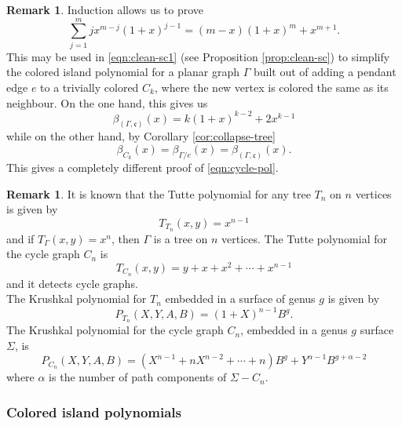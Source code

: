 \documentclass[10pt, reqno]{amsart}
\newcommand{\hf}{\hspace*{0.5cm}}
\theoremstyle{plain}
\theoremstyle{remark}
\theoremstyle{definition}
\newtheorem{rem}[theorem]{Remark}
\numberwithin{equation}{section}
\begin{document}
\begin{rem}
Induction allows us to prove
$$\sum_{j=1}^m jx^{m-j}(1+x)^{j-1}=(m-x)(1+x)^m+x^{m+1}.$$
This may be used in \eqref{eqn:clean-sc1} (see Proposition \ref{prop:clean-sc}) to simplify the colored island polynomial for a planar graph $\Gamma$ built out of adding a pendant edge $e$ to a trivially colored $C_k$, where the new vertex is colored the same as its neighbour. On the one hand, this gives us
$$\beta_{(\Gamma,\mathfrak{c})}(x)=k(1+x)^{k-2}+2x^{k-1}$$
while on the other hand, by Corollary \ref{cor:collapse-tree}   
$$\beta_{C_k}(x)=\beta_{\Gamma/e}(x)=\beta_{(\Gamma,\mathfrak{c})}(x).$$
This gives a completely different proof of \eqref{eqn:cycle-pol}.
\end{rem}
\begin{rem}
It is known that the Tutte polynomial for any tree $T_n$ on $n$ vertices is given by
$$T_{T_n}(x,y)=x^{n-1}$$
and if $T_\Gamma(x,y)=x^n$, then $\Gamma$ is a tree on $n$ vertices. The Tutte polynomial for the cycle graph $C_n$ is
$$T_{C_n}(x,y)=y+x+x^2+\cdots+x^{n-1}$$
and it detects cycle graphs.    \\
\hf The Krushkal polynomial for $T_n$ embedded in a surface of genus $g$ is given by
$$P_{T_n}(X,Y,A,B)=(1+X)^{n-1}B^g.$$
The Krushkal polynomial for the cycle graph $C_n$, embedded in a genus $g$ surface $\Sigma$, is
$$P_{C_n}(X,Y,A,B)=(X^{n-1}+nX^{n-2}+\cdots+n)B^g+Y^{\alpha-1}B^{g+\alpha-2}$$
where $\alpha$ is the number of path components of $\Sigma-C_n$.
\end{rem}

\subsubsection{Colored island polynomials}
\end{document}
